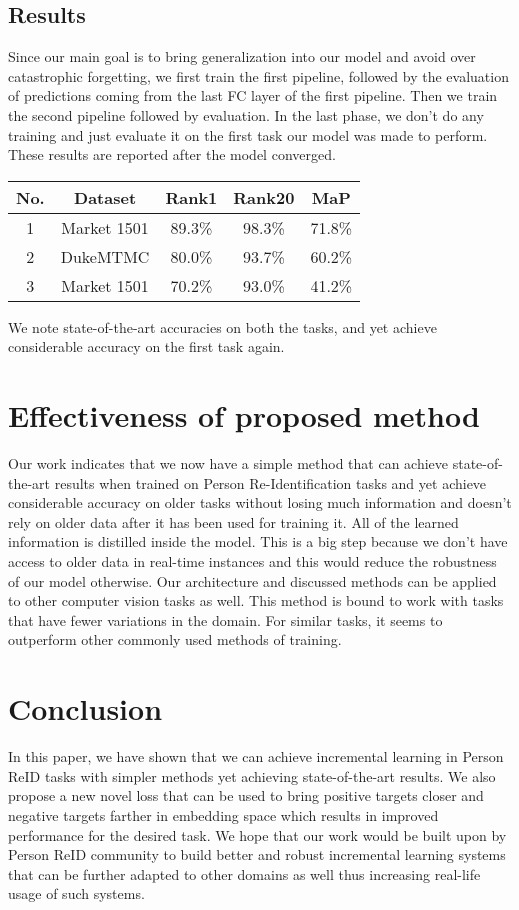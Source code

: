 \documentclass[10pt,twocolumn,letterpaper]{article}
\begin{document}
\subsection{Results}
Since our main goal is to bring generalization into our model and avoid over catastrophic forgetting, we first train the first pipeline, followed by the evaluation of predictions coming from the last FC layer of the first pipeline. Then we train the second pipeline followed by evaluation. In the last phase, we don't do any training and just evaluate it on the first task our model was made to perform. These results are reported after the model converged. 

\begin{table}[h!]
\centering
 \begin{tabular}{||c c c c c||} 
 \hline
 No. & Dataset& Rank1&Rank20&MaP\\ [0.5ex] 
 \hline\hline
 1 & Market 1501  & 89.3\% & 98.3\% & 71.8\% \\ 
 \hline
 2 & DukeMTMC & 80.0\%  & 93.7\%  & 60.2\% \\
 \hline
 3 & Market 1501 & 70.2\%  & 93.0\% & 41.2\% \\  [1ex] 
 \hline
\end{tabular}
\end{table}

We note state-of-the-art accuracies on both the tasks, and yet achieve considerable accuracy on the first task again. 

\section{Effectiveness of proposed method}

Our work indicates that we now have a simple method that can achieve state-of-the-art results when trained on Person Re-Identification tasks and yet achieve considerable accuracy on older tasks without losing much information and doesn't rely on older data after it has been used for training it. All of the learned information is distilled inside the model. This is a big step because we don't have access to older data in real-time instances and this would reduce the robustness of our model otherwise. Our architecture and discussed methods can be applied to other computer vision tasks as well. This method is bound to work with tasks that have fewer variations in the domain. For similar tasks, it seems to outperform other commonly used methods of training.

\section{Conclusion}
In this paper, we have shown that we can achieve incremental learning in Person ReID tasks with simpler methods yet achieving state-of-the-art results. We also propose a new novel loss that can be used to bring positive targets closer and negative targets farther in embedding space which results in improved performance for the desired task. We hope that our work would be built upon by Person ReID community to build better and robust incremental learning systems that can be further adapted to other domains as well thus increasing real-life usage of such systems. 


{\small


}
\end{document}
